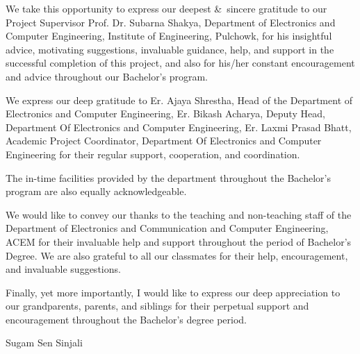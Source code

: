 \documentclass{article}
\begin{document}
\begin{abstract}
        
\end{abstract}


\noindent We take this opportunity to express our deepest \&\ sincere gratitude to our Project Supervisor Prof. Dr. Subarna Shakya, Department of Electronics and Computer Engineering, Institute of Engineering, Pulchowk, for his insightful advice, motivating suggestions, invaluable guidance, help, and support in the successful completion of this project, and also for his/her constant encouragement and advice throughout our Bachelor's
program.\par
\vspace{5pt}
\noindent We express our deep gratitude to Er. Ajaya Shrestha, Head of the Department of Electronics and Computer Engineering, Er. Bikash Acharya, Deputy Head, Department Of Electronics and Computer Engineering, Er. Laxmi Prasad Bhatt, Academic Project Coordinator, Department Of Electronics and Computer Engineering for their regular support, cooperation, and coordination.\par 
\vspace{5pt}
\noindent The in-time facilities provided by the department throughout the Bachelor's program are also equally acknowledgeable.\par 
\vspace{5pt}
\noindent We would like to convey our thanks to the teaching and non-teaching staff of the Department of Electronics and Communication and Computer Engineering, ACEM for their invaluable help and support throughout the period of Bachelor’s Degree. We are also grateful to all our classmates for their help, encouragement, and invaluable suggestions.\par
\vspace{5pt}

\noindent Finally, yet more importantly, I would like to express our deep appreciation to our grandparents, parents, and siblings for their perpetual support and encouragement throughout
the Bachelor’s degree period.\par
\vspace{20pt}
\noindent Sugam Sen Sinjali
\end{document}
